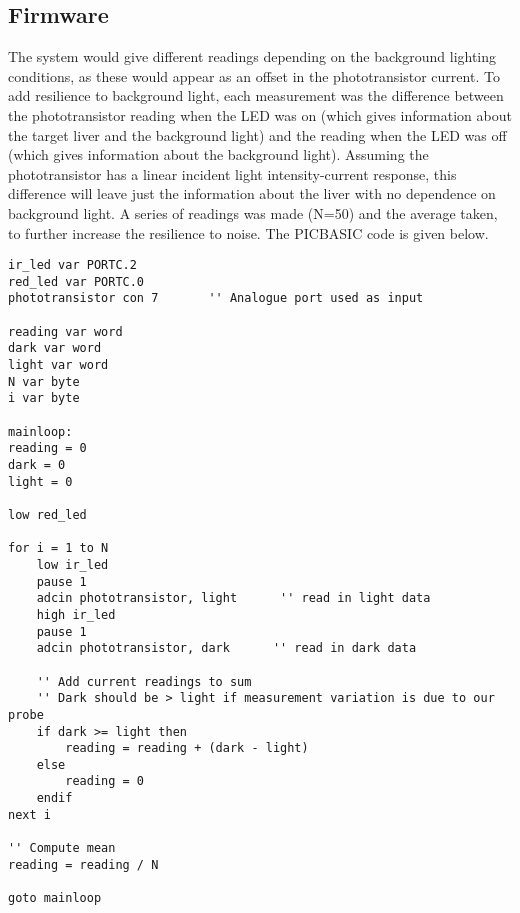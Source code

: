 \subsection{Firmware}
The system would give different readings depending on the background lighting conditions, as these would appear as an offset in the phototransistor current. To add resilience to background light, each measurement was the difference between the phototransistor reading when the LED was on (which gives information about the target liver and the background light) and the reading when the LED was off (which gives information about the background light). Assuming the phototransistor has a linear incident light intensity-current response, this difference will leave just the information about the liver with no dependence on background light. A series of readings was made (N=50) and the average taken, to further increase the resilience to noise. The PICBASIC code is given below.
\begin{lstlisting}
ir_led var PORTC.2
red_led var PORTC.0
phototransistor con 7       '' Analogue port used as input

reading var word
dark var word
light var word
N var byte
i var byte

mainloop:
reading = 0
dark = 0
light = 0

low red_led

for i = 1 to N
    low ir_led
    pause 1
    adcin phototransistor, light      '' read in light data
    high ir_led
    pause 1
    adcin phototransistor, dark      '' read in dark data
    
    '' Add current readings to sum
    '' Dark should be > light if measurement variation is due to our probe
    if dark >= light then
        reading = reading + (dark - light)
    else
        reading = 0
    endif
next i  

'' Compute mean
reading = reading / N

goto mainloop
\end{lstlisting}